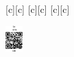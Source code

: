 [c][c]{\small {}}
[c][c]{\small {}}
[c][c]{\small {}}

\includegraphics[width=0.05\textwidth]{QRcode_ACoM_Email_LinkedIn.eps}